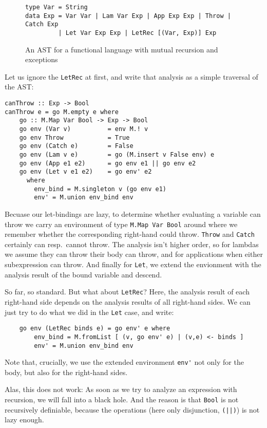 \documentclass[manuscript,screen,acmsmall]{acmart}
\begin{document}
\begin{figure}
\begin{verbatim}
type Var = String
data Exp = Var Var | Lam Var Exp | App Exp Exp | Throw | Catch Exp
         | Let Var Exp Exp | LetRec [(Var, Exp)] Exp
\end{verbatim}
\caption{An AST for a functional language with mutual recursion and exceptions}
\label{fig:analast}
\end{figure}

Let us ignore the \verb|LetRec| at first, and write that analysis as a simple traversal of the AST:
\begin{verbatim}
canThrow :: Exp -> Bool
canThrow e = go M.empty e where
    go :: M.Map Var Bool -> Exp -> Bool
    go env (Var v)          = env M.! v
    go env Throw            = True
    go env (Catch e)        = False
    go env (Lam v e)        = go (M.insert v False env) e
    go env (App e1 e2)      = go env e1 || go env e2
    go env (Let v e1 e2)    = go env' e2
      where
        env_bind = M.singleton v (go env e1)
        env' = M.union env_bind env
\end{verbatim}

Becuase our let-bindings are lazy, to determine whether evaluating a variable can throw we carry an environment of type \verb|M.Map Var Bool| around where we remember whether the corresponding right-hand could throw. \verb|Throw| and \verb|Catch| certainly can resp.\ cannot throw. The analysis isn't higher order, so for lambdas we assume they can throw their body can throw, and for applications when either subexpression can throw. And finally for \verb|Let|, we extend the envionment with the analysis result of the bound variable and descend.

So far, so standard. But what about \verb|LetRec|? Here, the analysis result of each right-hand side depends on the analysis results of all right-hand sides. We can just try to do what we did in the \verb|Let| case, and write:
\begin{verbatim}
    go env (LetRec binds e) = go env' e where
        env_bind = M.fromList [ (v, go env' e) | (v,e) <- binds ]
        env' = M.union env_bind env
\end{verbatim}
Note that, crucially, we use the extended environment \verb|env'| not only for the body, but also for the right-hand sides.

Alas, this does not work: As soon as we try to analyze an expression with recursion, we will fall into a black hole. And the reason is that \verb|Bool| is not recursively definiable, because the operations (here only disjunction, \verb+(||)+) is not lazy enough.
\end{document}
